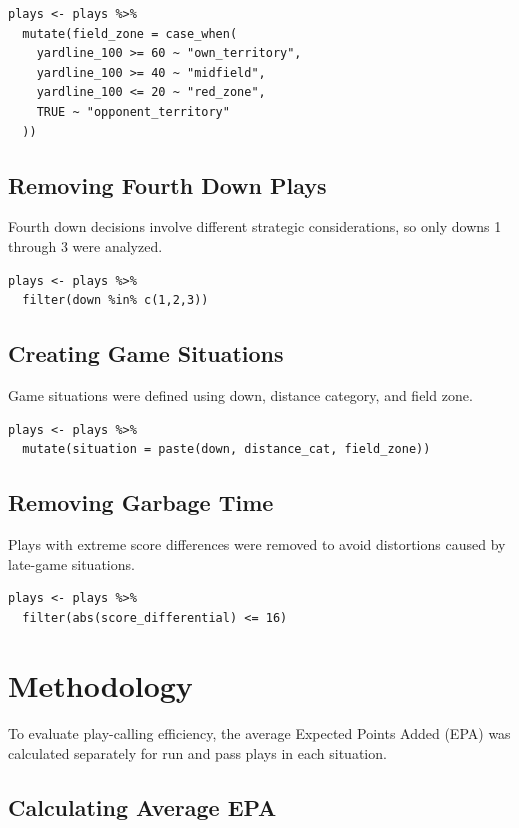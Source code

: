 \documentclass[12pt]{article}
\begin{document}
\begin{lstlisting}
plays <- plays %>%
  mutate(field_zone = case_when(
    yardline_100 >= 60 ~ "own_territory",
    yardline_100 >= 40 ~ "midfield",
    yardline_100 <= 20 ~ "red_zone",
    TRUE ~ "opponent_territory"
  ))
\end{lstlisting}

\subsection{Removing Fourth Down Plays}

Fourth down decisions involve different strategic considerations, so only downs 1 through 3 were analyzed.

\begin{lstlisting}
plays <- plays %>%
  filter(down %in% c(1,2,3))
\end{lstlisting}

\subsection{Creating Game Situations}

Game situations were defined using down, distance category, and field zone.

\begin{lstlisting}
plays <- plays %>%
  mutate(situation = paste(down, distance_cat, field_zone))
\end{lstlisting}

\subsection{Removing Garbage Time}

Plays with extreme score differences were removed to avoid distortions caused by late-game situations.

\begin{lstlisting}
plays <- plays %>%
  filter(abs(score_differential) <= 16)
\end{lstlisting}

\section{Methodology}

To evaluate play-calling efficiency, the average Expected Points Added (EPA) was calculated separately for run and pass plays in each situation.

\subsection{Calculating Average EPA}
\end{document}
